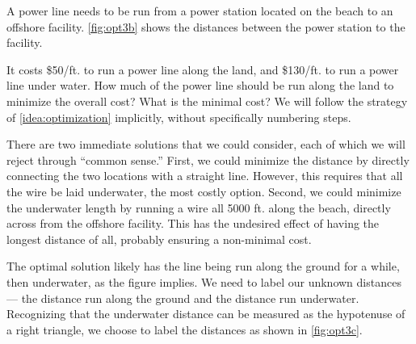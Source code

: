 \begin{example}\label{ex_opt3}%
A power line needs to be run from a power station located on the beach to an offshore facility. \autoref{fig:opt3b} shows the distances between the power station to the facility.

It costs \$50/ft. to run a power line along the land, and \$130/ft. to run a power line under water. How much of the power line should be run along the land to minimize the overall cost? What is the minimal cost?
\solution
We will follow the strategy of \autoref{idea:optimization} implicitly, without specifically numbering steps.

There are two immediate solutions that we could consider, each of which we will reject through ``common sense.'' First, we could minimize the distance by directly connecting the two locations with a straight line. However, this requires that all the wire be laid underwater, the most costly option. Second, we could minimize the underwater length by running a wire all 5000 ft. along the beach, directly across from the offshore facility. This has the undesired effect of having the longest distance of all, probably ensuring a non-minimal cost.

The optimal solution likely has the line being run along the ground for a while, then underwater, as the figure implies. We need to label our unknown distances --- the distance run along the ground and the distance run underwater. Recognizing that the underwater distance can be measured as the hypotenuse of a right triangle, we choose to label the distances as shown in \autoref{fig:opt3c}.



\end{example}
